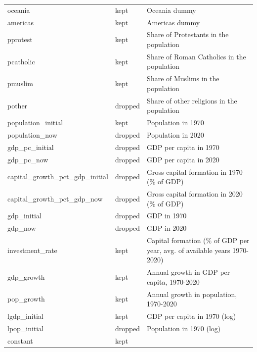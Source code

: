 \begin{tabular}{lll}
 oceania                        & kept     & Oceania dummy                                                            \\
 americas                       & kept     & Americas dummy                                                           \\
 pprotest                       & kept     & Share of Protestants in the population                                   \\
 pcatholic                      & kept     & Share of Roman Catholics in the population                               \\
 pmuslim                        & kept     & Share of Muslims in the population                                       \\
 pother                         & dropped  & Share of other religions in the population                               \\
 population\_initial             & kept     & Population in 1970                                                       \\
 population\_now                 & dropped  & Population in 2020                                                       \\
 gdp\_pc\_initial                 & dropped  & GDP per capita in 1970                                                   \\
 gdp\_pc\_now                     & dropped  & GDP per capita in 2020                                                   \\
 capital\_growth\_pct\_gdp\_initial & dropped  & Gross capital formation in 1970 (\% of GDP)                               \\
 capital\_growth\_pct\_gdp\_now     & dropped  & Gross capital formation in 2020 (\% of GDP)                               \\
 gdp\_initial                    & dropped  & GDP in 1970                                                              \\
 gdp\_now                        & dropped  & GDP in 2020                                                              \\
 investment\_rate                & kept     & Capital formation (\% of GDP per year, avg. of available years 1970-2020) \\
 gdp\_growth                     & kept     & Annual growth in GDP per capita, 1970-2020                               \\
 pop\_growth                     & kept     & Annual growth in population, 1970-2020                                   \\
 lgdp\_initial                   & kept     & GDP per capita in 1970 (log)                                             \\
 lpop\_initial                   & dropped  & Population in 1970 (log)                                                 \\
 constant                       & kept     &                                                                          \\
\bottomrule
\end{tabular}